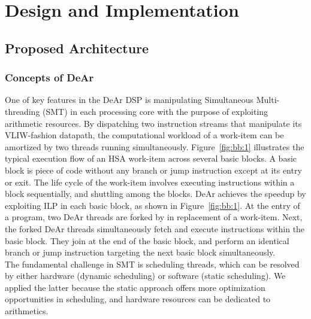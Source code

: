 \chapter{Design and Implementation}
\section{Proposed Architecture}
\subsection{Concepts of DeAr}
\indent 
One of key features in the DeAr DSP is manipulating Simultaneous Multi-threading (SMT) in each processing core with the purpose of exploiting arithmetic resources.
By dispatching two instruction streams that manipulate its VLIW-fashion datapath, 
the computational workload of a work-item can be amortized by two threads running simultaneously.
Figure~\ref{fig:bb:1} illustrates the typical execution flow of an HSA work-item across several basic blocks.
A basic block is piece of code without any branch or jump instruction except at its entry or exit.
The life cycle of the work-item involves executing instructions within a block sequentially, and shuttling among the blocks.
DeAr achieves the speedup by exploiting ILP in each basic block, as shown in Figure~\ref{fig:bb:1}. 
At the entry of a program, two DeAr threads are forked by in replacement of a work-item.
Next, the forked DeAr threads simultaneously fetch and execute instructions within the basic block.
They join at the end of the basic block, and perform an identical branch or jump instruction targeting the next basic block simultaneously.
\\\indent
The fundamental challenge in SMT is scheduling threads, 
which can be resolved by either hardware (dynamic scheduling) or software (static scheduling).
We applied the latter because the static approach offers more optimization opportunities in scheduling, 
and hardware resources can be dedicated to arithmetics.
\vspace{\textfig}
